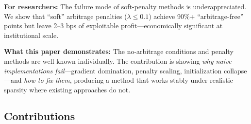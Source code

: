 \documentclass[11pt,a4paper]{article}
\begin{document}
\textbf{For researchers:} The failure mode of soft-penalty methods is underappreciated. We show that ``soft'' arbitrage penalties ($\lambda \leq 0.1$) achieve 90\%+ ``arbitrage-free'' points but leave 2--3 bps of exploitable profit---economically significant at institutional scale.

\textbf{What this paper demonstrates:} The no-arbitrage conditions and penalty methods are well-known individually. The contribution is showing \textit{why naive implementations fail}---gradient domination, penalty scaling, initialization collapse---and \textit{how to fix them}, producing a method that works stably under realistic sparsity where existing approaches do not.

\subsection{Contributions}
\end{document}
